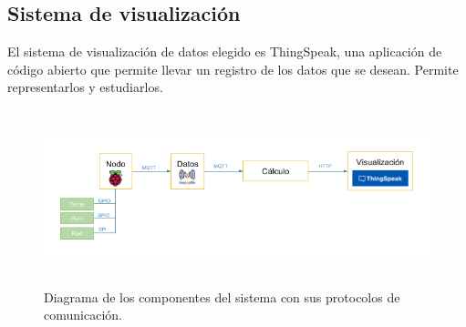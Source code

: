 \subsection{Sistema de visualización}
\label{makereference1.2.4}
El sistema de visualización de datos elegido es ThingSpeak, una aplicación de código abierto que permite llevar un registro de los datos que se desean. Permite representarlos y estudiarlos.

\begin{figure}[htb]
    \begin{center}
        \includegraphics[height=2in]{figures/diagrama-sistema.png}
        \caption{Diagrama de los componentes del sistema con sus protocolos de comunicación.}
    \end{center}
    \label{diagrama-sistema}
\end{figure}
